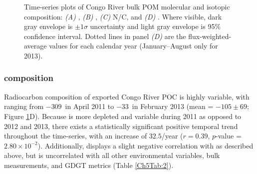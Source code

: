 \begin{figure}[ht]
	\caption[Bulk parameter time-series plots]{Time-series plots of Congo River bulk POM molecular and isotopic composition: \textit{(A)} , \textit{(B)} , \textit{(C)} N/C, and \textit{(D)} . Where visible, dark gray envelope is $\pm 1 \sigma$ uncertainty and light gray envelope is 95\% confidence interval. Dotted lines in panel \textit{(D)} are the flux-weighted-average values for each calendar year (January--August only for 2013).}
	\label{Ch5Fig:3} 
\end{figure}

\subsubsection{ composition}

Radiocarbon composition of exported Congo River POC is highly variable, with  ranging from $-309$\textperthousand\ in April 2011 to $-33$\textperthousand\ in February 2013 (mean = $-105 \pm 69$\textperthousand; Figure \ref{Ch5Fig:3}D). Because  is more depleted and variable during 2011 as opposed to 2012 and 2013, there exists a statistically significant positive temporal trend throughout the time-series, with an increase of $32.5$\textperthousand/year ($r = 0.39$, $p$-value = $2.80 \times 10^{-2}$). Additionally,  displays a slight negative correlation with  as described above, but is uncorrelated with all other environmental variables, bulk measurements, and GDGT metrics (Table \ref{Ch5Tab:2}).


